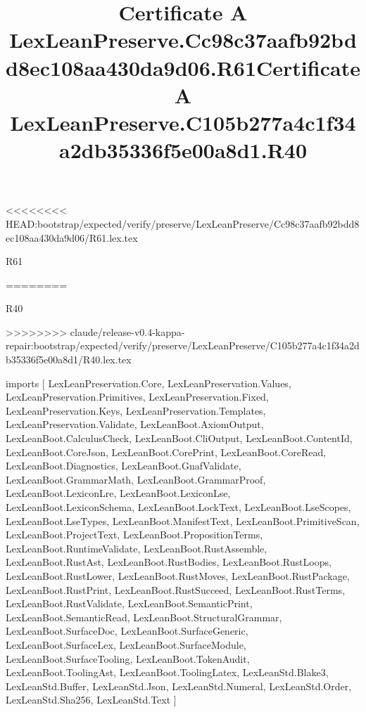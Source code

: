 <<<<<<<< HEAD:bootstrap/expected/verify/preserve/LexLeanPreserve/Cc98c37aafb92bdd8ec108aa430da9d06/R61.lex.tex
\begin{lexlean}{R61}
\title{Certificate A LexLeanPreserve.Cc98c37aafb92bdd8ec108aa430da9d06.R61}
========
\begin{lexlean}{R40}
\title{Certificate A LexLeanPreserve.C105b277a4c1f34a2db35336f5e00a8d1.R40}
>>>>>>>> claude/release-v0.4-kappa-repair:bootstrap/expected/verify/preserve/LexLeanPreserve/C105b277a4c1f34a2db35336f5e00a8d1/R40.lex.tex
\begin{coremodule}
imports [
  LexLeanPreservation.Core,
  LexLeanPreservation.Values,
  LexLeanPreservation.Primitives,
  LexLeanPreservation.Fixed,
  LexLeanPreservation.Keys,
  LexLeanPreservation.Templates,
  LexLeanPreservation.Validate,
  LexLeanBoot.AxiomOutput,
  LexLeanBoot.CalculusCheck,
  LexLeanBoot.CliOutput,
  LexLeanBoot.ContentId,
  LexLeanBoot.CoreJson,
  LexLeanBoot.CorePrint,
  LexLeanBoot.CoreRead,
  LexLeanBoot.Diagnostics,
  LexLeanBoot.GnafValidate,
  LexLeanBoot.GrammarMath,
  LexLeanBoot.GrammarProof,
  LexLeanBoot.LexiconLre,
  LexLeanBoot.LexiconLse,
  LexLeanBoot.LexiconSchema,
  LexLeanBoot.LockText,
  LexLeanBoot.LseScopes,
  LexLeanBoot.LseTypes,
  LexLeanBoot.ManifestText,
  LexLeanBoot.PrimitiveScan,
  LexLeanBoot.ProjectText,
  LexLeanBoot.PropositionTerms,
  LexLeanBoot.RuntimeValidate,
  LexLeanBoot.RustAssemble,
  LexLeanBoot.RustAst,
  LexLeanBoot.RustBodies,
  LexLeanBoot.RustLoops,
  LexLeanBoot.RustLower,
  LexLeanBoot.RustMoves,
  LexLeanBoot.RustPackage,
  LexLeanBoot.RustPrint,
  LexLeanBoot.RustSucceed,
  LexLeanBoot.RustTerms,
  LexLeanBoot.RustValidate,
  LexLeanBoot.SemanticPrint,
  LexLeanBoot.SemanticRead,
  LexLeanBoot.StructuralGrammar,
  LexLeanBoot.SurfaceDoc,
  LexLeanBoot.SurfaceGeneric,
  LexLeanBoot.SurfaceLex,
  LexLeanBoot.SurfaceModule,
  LexLeanBoot.SurfaceTooling,
  LexLeanBoot.TokenAudit,
  LexLeanBoot.ToolingAst,
  LexLeanBoot.ToolingLatex,
  LexLeanStd.Blake3,
  LexLeanStd.Buffer,
  LexLeanStd.Json,
  LexLeanStd.Numeral,
  LexLeanStd.Order,
  LexLeanStd.Sha256,
  LexLeanStd.Text
]


\end{coremodule}
\end{lexlean}
\end{lexlean}
